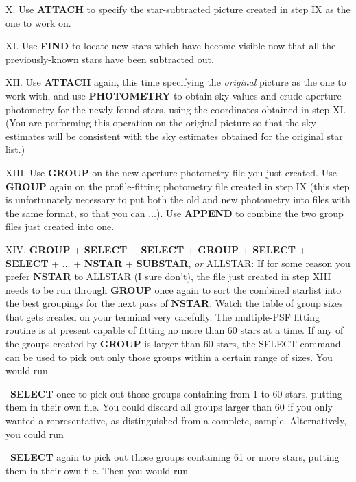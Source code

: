 \item{X.} Use {\bf ATTACH} to specify the star-subtracted picture
created in step IX as the one to work on.

\item{XI.} Use {\bf FIND} to locate new stars which have become visible
now that all the previously-known stars have been subtracted out.

\item{XII.} Use {\bf ATTACH} again, this time specifying the {\it
original} picture as the one to work with, and use {\bf PHOTOMETRY} to
obtain sky values and crude aperture photometry for the newly-found
stars, using the coordinates obtained in step XI.  (You are performing
this operation on the original picture so that the sky estimates will
be consistent with the sky estimates obtained for the original star
list.)

\item{XIII.} Use {\bf GROUP} on the new aperture-photometry file you
just created.  Use {\bf GROUP} again on the profile-fitting photometry
file created in step IX (this step is unfortunately necessary to put
both the old and new photometry into files with the same format, so
that you can $\ldots$).  Use {\bf APPEND} to combine the two group
files just created into one.

\item{XIV.} {\bf GROUP} + {\bf SELECT} + {\bf SELECT} + {\bf GROUP} +
{\bf SELECT} + {\bf SELECT} + $\ldots$ + {\bf NSTAR} + {\bf SUBSTAR},
{\it or\/} ALLSTAR:  If for some reason you prefer {\bf NSTAR} to
ALLSTAR (I sure don't), the file just created in step XIII needs to be
run through {\bf GROUP} once again to sort the combined starlist into
the best groupings for the next pass of {\bf NSTAR}.  Watch the table
of group sizes that gets created on your terminal very carefully.  The
multiple-PSF fitting routine is at present capable of fitting no more
than 60 stars at a time.  If any of the groups created by {\bf GROUP}
is larger than 60 stars, the SELECT command can be used to pick out
only those groups within a certain range of sizes.  You would run

~{\bf SELECT} once to pick out those groups containing
from 1 to 60 stars, putting them in their own file.  You could discard
all groups larger than 60 if you only wanted a representative, as
distinguished from a complete, sample.  Alternatively, you could run

~{\bf SELECT} again to pick out those groups containing
61 or more stars, putting them in their own file.  Then you would run

